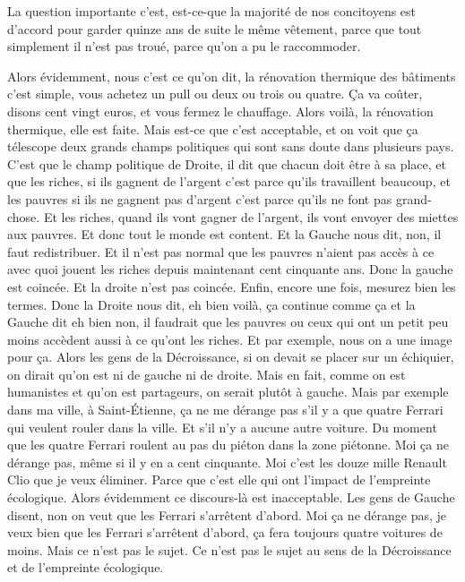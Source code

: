 \begin{description}
La question importante c'est, est-ce-que la majorité de nos concitoyens est d'accord pour garder quinze ans de suite  le même vêtement, parce que tout simplement il n’est pas troué, parce qu'on a pu le raccommoder. 

Alors évidemment, nous c'est ce qu'on dit, la rénovation thermique des bâtiments c'est simple, vous achetez un pull ou deux ou trois ou quatre. Ça va coûter, disons cent vingt euros, et vous fermez le chauffage. Alors voilà, la rénovation thermique, elle est faite. Mais est-ce que c'est acceptable, et on voit que ça télescope deux grands champs politiques qui sont sans doute dans plusieurs pays. C'est que le champ politique de Droite, il dit que chacun doit être à sa place, et que les riches, si ils gagnent de l'argent c'est parce qu'ils travaillent beaucoup, et les pauvres si ils ne gagnent pas d'argent c'est parce qu'ils  ne font pas grand-chose. Et les riches, quand ils vont gagner de l'argent, ils vont envoyer des miettes aux pauvres. Et donc tout le monde est content. Et la Gauche nous dit, non, il faut redistribuer. Et il n'est pas normal que les pauvres n'aient pas accès à ce avec quoi jouent les riches depuis maintenant cent cinquante ans. Donc la gauche est coincée. Et la droite n'est pas coincée. Enfin, encore une fois, mesurez bien les termes. Donc la Droite nous dit, eh bien voilà, ça continue comme ça et la Gauche dit eh bien non, il faudrait que les pauvres ou ceux qui ont un petit peu moins accèdent aussi à ce qu'ont les riches. Et par exemple, nous on a une image pour ça. Alors les gens de la Décroissance, si on devait se placer sur un échiquier, on dirait qu'on est ni de gauche ni de droite. Mais en fait, comme on est humanistes et qu'on est partageurs, on serait plutôt à gauche. Mais par exemple dans ma ville, à Saint-Étienne, ça ne me dérange pas s’il y a que quatre Ferrari qui veulent rouler dans la ville. Et s’il n'y a aucune autre voiture. Du moment que les quatre Ferrari roulent au pas du piéton dans la zone piétonne. Moi ça ne dérange pas, même si il y en a cent cinquante. Moi c'est les douze mille Renault Clio que je veux éliminer. Parce que c'est elle qui ont l'impact de l'empreinte écologique. Alors évidemment ce discours-là est inacceptable. Les gens de Gauche disent, non on veut que les Ferrari s'arrêtent d'abord. Moi ça ne dérange pas, je veux bien que les Ferrari s'arrêtent d'abord, ça fera toujours quatre voitures de moins. Mais ce n'est pas le sujet. Ce n'est pas le sujet au sens de la Décroissance et de l'empreinte écologique.


\end{description}
